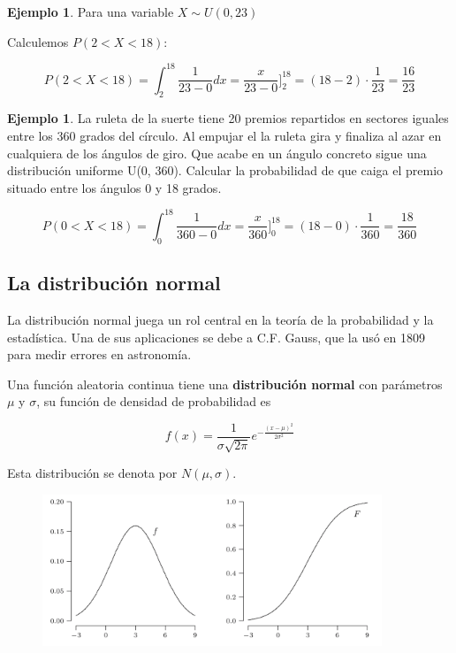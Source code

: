 \documentclass[]{book}
\theoremstyle{plain}
\theoremstyle{definition}
\newtheorem{example}[theorem]{Ejemplo}
\theoremstyle{definition} %
\begin{document}
\begin{example}
  Para una variable  $\displaystyle X\sim U(0,23)$


  Calculemos $\displaystyle  P(2<X<18)$:

   \[\displaystyle P(2<X<18)=\int^{18}_2 \frac {1}{23-0} dx =  \frac {x}{23-0} \bigg]^{18}_2 =  (18-2)\cdot {\frac {1}{23}}={\frac {16}{23}} \]
\end{example}

\begin{example}
La ruleta de la suerte tiene 20 premios repartidos en sectores iguales entre los 360 grados del círculo. Al empujar el 
la ruleta gira y finaliza al azar en cualquiera de los ángulos de giro. 
Que acabe en un ángulo concreto sigue una distribución uniforme U(0, 360). 
Calcular la probabilidad de que caiga el premio situado entre los ángulos 0 y 18 grados.
 

\[\displaystyle P(0<X<18)=\int^{18}_0 \frac {1}{360-0} dx =  \frac {x}{360} \bigg]^{18}_0 =  (18-0)\cdot {\frac {1}{360}}={\frac {18}{360}} \]

\end{example}




\subsection{La distribución normal} 

La distribución normal juega un rol central en la teoría de la
probabilidad y la estadística. Una de sus aplicaciones se debe a C.F.
Gauss, que la usó en 1809 para medir errores en astronomía.

Una función aleatoria continua tiene una \textbf{distribución normal}
con parámetros \(\mu\) y \(\sigma\), su función de densidad de
probabilidad es

\[f(x) = \frac{1}{\sigma \sqrt{2\pi}} e^{-\frac{(x-\mu)^2}{2\sigma^2}}\]

Esta distribución se denota por \(N(\mu, \sigma)\).


\begin{figure}
  \centering
  \includegraphics[width=4in,height=\textheight]{img/sc_3.png}
  \caption{ }
\end{figure}
\end{document}

